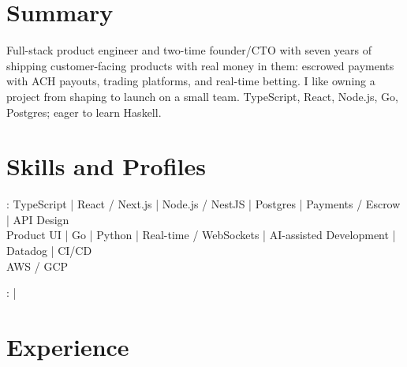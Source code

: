 \documentclass[print]{jack-resume}
\begin{document}
\pagecolor{darkmodeBackground}


\begin{minipage}[t][1cm][t]{.03\textwidth}
    \hfill
\end{minipage}

\section{Summary}
Full-stack product engineer and two-time founder/CTO with seven years of shipping customer-facing products with real money in them: escrowed payments with ACH payouts, trading platforms, and real-time betting. I like owning a project from shaping to launch on a small team. TypeScript, React, Node.js, Go, Postgres; eager to learn Haskell.
\sectionsep

\section{Skills and Profiles}
:
TypeScript \hfill | \hfill
React / Next.js \hfill | \hfill
Node.js / NestJS \hfill | \hfill
Postgres \hfill | \hfill
Payments / Escrow \hfill | \hfill
API Design \\
\hspace{1.0cm} Product UI \hfill | \hfill
Go \hfill | \hfill
Python \hfill | \hfill
Real-time / WebSockets \hfill | \hfill
AI-assisted Development \hfill | \hfill
Datadog \hfill | \hfill
CI/CD \\
\hspace{1.0cm} AWS / GCP \\

\raggedright{
    :
      \href{https://www.linkedin.com/in/jack-sturtevant/}{ \ExternalLink} |
     \href{https://github.com/jacksturt}{ \ExternalLink}}

\section{Experience}
\end{document}
